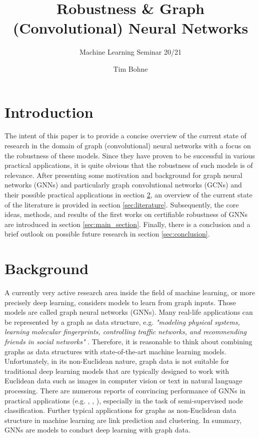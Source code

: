 \documentclass[a4paper,preprint]{sig-alternate}
\begin{document}
\title{Robustness \& Graph (Convolutional) Neural Networks}

\subtitle{Machine Learning Seminar 20/21}

%
\author{
%
\alignauthor Tim Bohne\\
}

\maketitle

\section{Introduction}

The intent of this paper is to provide a concise overview of the current state of research in the domain of graph (convolutional) neural networks
with a focus on the robustness of these models. Since they have proven to be successful in various practical applications, 
it is quite obvious that the robustness of such models is of relevance.
After presenting some motivation and background for graph neural networks (GNNs) and particularly graph convolutional networks (GCNs)
and their possible practical applications in section \ref{sec:background}, an overview of the current state of the literature is
provided in section \ref{sec:literature}. Subsequently, the core ideas, methods, and results of the first works on certifiable
robustness of GNNs are introduced in section \ref{sec:main_section}.
Finally, there is a conclusion and a brief outlook on possible future research in section \ref{sec:conclusion}.

\section{Background}
\label{sec:background}

A currently very active research area inside the field of machine learning, or more precisely deep learning, considers models to learn
from graph inputs. Those models are called graph neural networks (GNNs). 
Many real-life applications can be represented by a graph as data structure, e.g. \textit{"modeling physical systems, learning molecular fingerprints,
controlling traffic networks, and recommending friends in social networks"} \cite{Liu_2020}. 
Therefore, it is reasonable to think about combining graphs as data structures with state-of-the-art machine learning models.
Unfortunately, in its non-Euclidean nature, graph data is not suitable for traditional deep learning models that are typically designed 
to work with Euclidean data such as images in computer vision or text in natural language processing. \cite{Liu_2020}
There are numerous reports of convincing performance of GNNs in practical applications (e.g. \cite{NIPS2015_f9be311e},
\cite{hamilton2018inductive}, \cite{trivedi2017knowevolve}), especially in the task of semi-supervised node classification. \cite{xu2019topology}
Further typical applications for graphs as non-Euclidean data structure in machine learning are link prediction and clustering. \cite{Zhou_2019}
In summary, GNNs are models to conduct deep learning with graph data.
\end{document}
